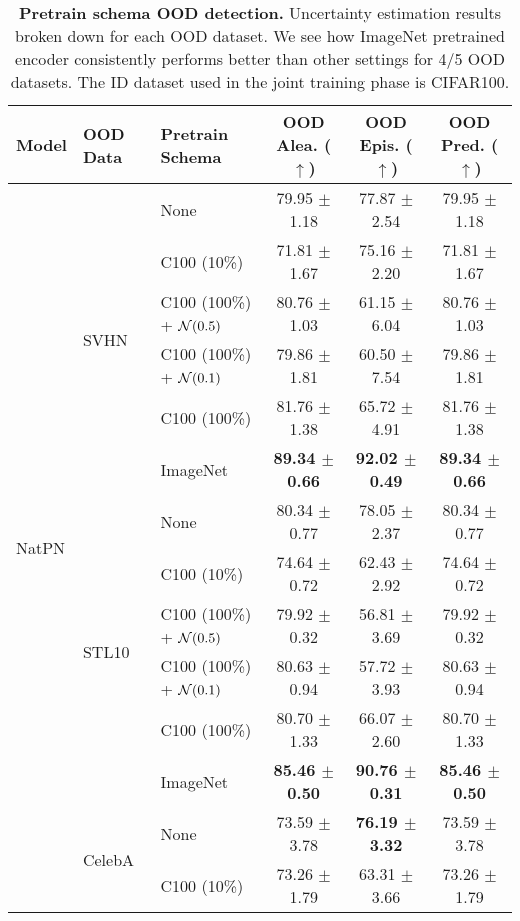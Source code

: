 \begin{table}[!htb]\centering
\caption{\textbf{Pretrain schema OOD detection.} Uncertainty estimation results broken down for each OOD dataset. We see how ImageNet pretrained encoder consistently performs better than other settings for 4/5 OOD datasets. The ID dataset used in the joint training phase is CIFAR100.}
\label{tab:training_pretrain_ood}
\tiny
\begin{tabular}{lllccc}
    \toprule
    \textbf{Model} &\textbf{OOD Data} &\textbf{Pretrain Schema} &\textbf{OOD Alea. ($\uparrow$)} &\textbf{OOD Epis. ($\uparrow$)} &\textbf{OOD Pred. ($\uparrow$)} \\
    \midrule
    \multirow{30}{*}{NatPN} 
    &\multirow{6}{*}{SVHN} &None &79.95 $\pm$ 1.18 &77.87 $\pm$ 2.54 &79.95 $\pm$ 1.18 \\
    & &C100 (10\%) &71.81 $\pm$ 1.67 &75.16 $\pm$ 2.20 &71.81 $\pm$ 1.67 \\
& &C100 (100\%) + ${\mathcal{N}}(0.5)$ &80.76 $\pm$ 1.03 &61.15 $\pm$ 6.04 &80.76 $\pm$ 1.03 \\
& &C100 (100\%) + ${\mathcal{N}}(0.1)$ &79.86 $\pm$ 1.81 &60.50 $\pm$ 7.54 &79.86 $\pm$ 1.81 \\
    & &C100 (100\%) &81.76 $\pm$ 1.38 &65.72 $\pm$ 4.91 &81.76 $\pm$ 1.38 \\
    & &ImageNet &\textbf{89.34 $\pm$ 0.66} &\textbf{92.02 $\pm$ 0.49} &\textbf{89.34 $\pm$ 0.66} \\
    \cmidrule[0.1pt](lr){2-6}
    &\multirow{6}{*}{STL10} &None &80.34 $\pm$ 0.77 &78.05 $\pm$ 2.37 &80.34 $\pm$ 0.77 \\
    & &C100 (10\%) &74.64 $\pm$ 0.72 &62.43 $\pm$ 2.92 &74.64 $\pm$ 0.72 \\
& &C100 (100\%) + ${\mathcal{N}}(0.5)$ &79.92 $\pm$ 0.32 &56.81 $\pm$ 3.69 &79.92 $\pm$ 0.32 \\
& &C100 (100\%) + ${\mathcal{N}}(0.1)$ &80.63 $\pm$ 0.94 &57.72 $\pm$ 3.93 &80.63 $\pm$ 0.94 \\
    & &C100 (100\%) &80.70 $\pm$ 1.33 &66.07 $\pm$ 2.60 &80.70 $\pm$ 1.33 \\
    & &ImageNet &\textbf{85.46 $\pm$ 0.50} &\textbf{90.76 $\pm$ 0.31} &\textbf{85.46 $\pm$ 0.50} \\
    \cmidrule[0.1pt](lr){2-6}
    &\multirow{6}{*}{CelebA} &None &73.59 $\pm$ 3.78 &\textbf{76.19 $\pm$ 3.32} &73.59 $\pm$ 3.78 \\
    & &C100 (10\%) &73.26 $\pm$ 1.79 &63.31 $\pm$ 3.66 &73.26 $\pm$ 1.79 \\

\end{tabular}
\end{table}
